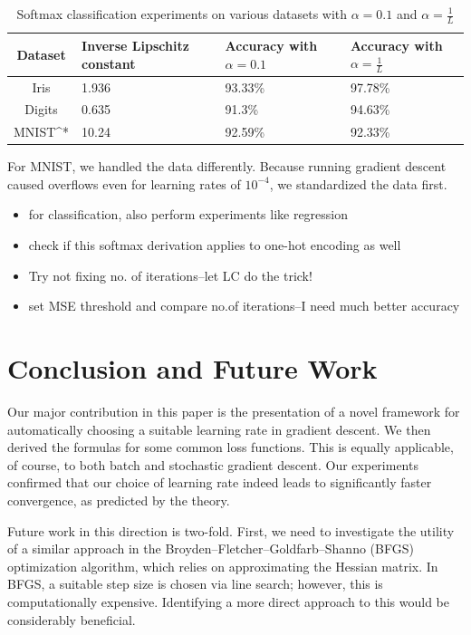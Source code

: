 \documentclass{article}
\begin{document}
\begin{table}
    \caption{Softmax classification experiments on various datasets with $\alpha=0.1$ and $\alpha=\frac{1}{L}$}
    \centering
    \begin{tabularx}{\textwidth}{cYYY}
        \toprule
        Dataset & Inverse Lipschitz constant & Accuracy with $\alpha=0.1$ & Accuracy with $\alpha=\frac{1}{L}$ \\
        \midrule
        Iris & 1.936 & 93.33\% & 97.78\% \\
        Digits & 0.635 & 91.3\% & 94.63\% \\
        MNIST^* & 10.24 & 92.59\% & 92.33\% \\
        \bottomrule
    \end{tabularx}
    \label{tab:classif:2}
\end{table}

For MNIST, we handled the data differently. Because running gradient descent caused overflows even for learning rates of $10^{-4}$, we standardized the data first.

\begin{itemize}
    \item for classification, also perform experiments like regression
    \item check if this softmax derivation applies to one-hot encoding as well
    \item Try not fixing no. of iterations--let LC do the trick!
    \item set MSE threshold and compare no.of iterations--I need much better accuracy
\end{itemize}

\section{Conclusion and Future Work}
Our major contribution in this paper is the presentation of a novel framework for automatically choosing a suitable learning rate in gradient descent. We then derived the formulas for some common loss functions. This is equally applicable, of course, to both batch and stochastic gradient descent. Our experiments confirmed that our choice of learning rate indeed leads to significantly faster convergence, as predicted by the theory.

Future work in this direction is two-fold. First, we need to investigate the utility of a similar approach in the Broyden–Fletcher–Goldfarb–Shanno (BFGS)\cite{broyden1970convergence}\cite{fletcher1970new}\cite{goldfarb1970family}\cite{shanno1970conditioning} optimization algorithm, which relies on approximating the Hessian matrix. In BFGS, a suitable step size is chosen via line search; however, this is computationally expensive. Identifying a more direct approach to this would be considerably beneficial.
\end{document}
